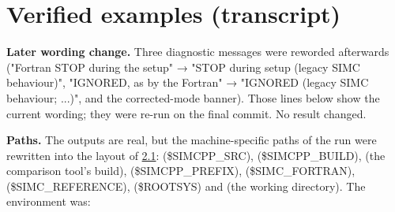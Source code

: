 \chapter{\texorpdfstring{Verified examples (transcript)}{Verified examples (transcript)}}\label{user_manual-VERIFIEDu5fEXAMPLES}
\textbf{Later wording change.} Three diagnostic messages were reworded afterwards ("Fortran STOP during the setup" → "STOP during setup (legacy SIMC behaviour)",\allowbreak{} "IGNORED, as by the Fortran" → "IGNORED (legacy SIMC behaviour; ...)", and the corrected-mode banner). Those lines below show the current wording; they were re-run on the final commit. No result changed.

\textbf{Paths.} The outputs are real, but the machine-specific paths of the run were rewritten into the layout of
\hyperref[user_manual-02u5finstallation:21-directory-layout-used-in-this-manual]{2.1}:  (\$SIMCPP\_\allowbreak{}SRC),\allowbreak{} 
(\$SIMCPP\_\allowbreak{}BUILD),\allowbreak{}  (the comparison tool's build),  (\$SIMCPP\_\allowbreak{}PREFIX),\allowbreak{}
 (\$SIMC\_\allowbreak{}FORTRAN),\allowbreak{}  (\$SIMC\_\allowbreak{}REFERENCE),\allowbreak{}  (\$ROOTSYS) and 
(the working directory). The environment was:

